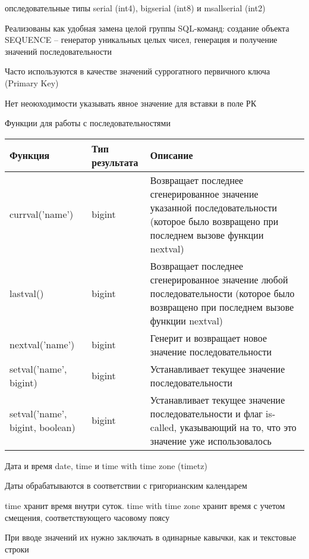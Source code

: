\documentclass[12pt]{article}
\begin{document}
\begin{defin}{опследовательные типы}
    serial (int4), bigserial (int8) и msallserial (int2)

    Реализованы как удобная замена целой группы SQL-команд: создание объекта SEQUENCE -- генератор уникальных целых чисел, генерация и получение значений последовательности 

    Часто используются в качестве значений суррогатного первичного ключа (Primary Key)

    Нет неоюходимости указывать явное значение для вставки в поле РК 
\end{defin}

\begin{nota}{Функции для работы с последовательностями}
    \begin{center}
        \begin{tabular}{|m{7em}|m{4em}|m{25em}|}
            \hline
            Функция & Тип результата & Описание \\ 
            \hline
            currval('name') & bigint & Возвращает последнее сгенерированное значение указанной последовательности (которое было возвращено при последнем вызове функции nextval) \\
            \hline
            lastval() & bigint & Возвращает последнее сгенерированное значение любой последовательности (которое было возвращено при последнем вызове функции nextval) \\
            \hline 
            nextval('name') & bigint & Генерит и возвращает новое значение последовательности \\ 
            \hline
            setval('name', bigint) & bigint & Устанавливает текущее значение последовательности \\
            \hline
            setval('name', bigint, boolean) & bigint & Устанавливает текущее значение последовательности и флаг is-called, указывающий на то, что это значение уже использовалось \\
            \hline
        \end{tabular}
    \end{center}
\end{nota}

\begin{defin}{Дата и время}
    date, time и time with time zone (timetz)

    Даты обрабатываются в соответствии с григорианским календарем

    time хранит время внутри суток. time with time zone хранит время с учетом смещения, соответствующего часовому поясу

    При вводе значений их нужно заключать в одинарные кавычки, как и текстовые строки
\end{defin}
\end{document}
